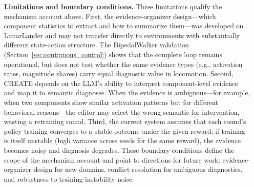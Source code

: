 \textbf{Limitations and boundary conditions.} Three limitations qualify the mechanism account above. First, the evidence-organizer design---which component statistics to extract and how to summarize them---was developed on LunarLander and may not transfer directly to environments with substantially different state-action structure. The BipedalWalker validation (Section~\ref{sec:continuous_control}) shows that the complete loop remains operational, but does not test whether the same evidence types (e.g., activation rates, magnitude shares) carry equal diagnostic value in locomotion. Second, CREATE depends on the LLM's ability to interpret component-level evidence and map it to semantic diagnoses. When the evidence is ambiguous---for example, when two components show similar activation patterns but for different behavioral reasons---the editor may select the wrong semantic for intervention, wasting a retraining round. Third, the current system assumes that each round's policy training converges to a stable outcome under the given reward; if training is itself unstable (high variance across seeds for the same reward), the evidence becomes noisy and diagnosis degrades. These boundary conditions define the scope of the mechanism account and point to directions for future work: evidence-organizer design for new domains, conflict resolution for ambiguous diagnostics, and robustness to training-instability noise.
